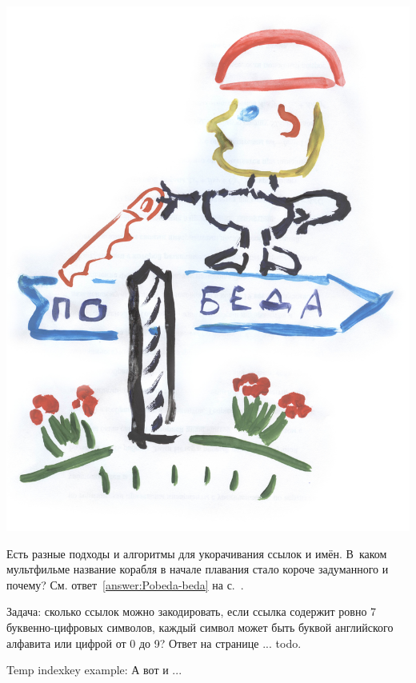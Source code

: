 \begin{marginfigure}
{%
\setlength{\fboxsep}{0pt}%
\setlength{\fboxrule}{1pt}%
\includegraphics{./graphics/sketch/short_link_knauff_pobeda_v3.jpg}
}%

\caption{Есть разные подходы и алгоритмы для укорачивания ссылок и имён. В~каком 
    мультфильме название корабля в начале плавания стало короче задуманного и почему?
    См. ответ~\ref{answer:Pobeda-beda} на с.~\pageref{answer:Pobeda-beda}.}
\label{fig:Pobeda-beda}
\end{marginfigure}

Задача: сколько ссылок можно закодировать, 
        если ссылка содержит ровно 7 буквенно-цифровых символов,
        каждый символ может быть буквой английского алфавита 
        или цифрой от 0 до 9? Ответ на странице ... todo.

Temp indexkey example: А вот и ...
